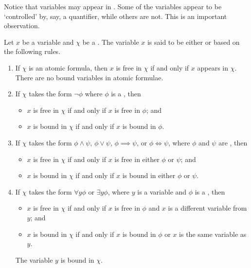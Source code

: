 Notice that variables may appear in \wffs. Some of the variables appear to be `controlled' by, say, a quantifier, while others are not. This is an important observation.

\begin{definition}
    Let $x$ be a variable and $\chi$ be a \wff. The variable $x$ is said to be either  or  based on the following rules.
    \begin{enumerate}[label=\textbf{V\arabic*.},leftmargin=1.35\parindent]
        \item If $\chi$ is an atomic formula, then $x$ is free in $\chi$ if and only if $x$ appears in $\chi$. There are no bound variables in atomic formulae.
        \item If $\chi$ takes the form $\lnot \phi$ where $\phi$ is a \wff, then
        \begin{itemize}
            \item $x$ is free in $\chi$ if and only if $x$ is free in $\phi$; and
            \item $x$ is bound in $\chi$ if and only if $x$ is bound in $\phi$.
        \end{itemize}
        \item If $\chi$ takes the form $\phi\land\psi$, $\phi\lor\psi$, $\phi\implies\psi$, or $\phi\iff\psi$, where $\phi$ and $\psi$ are \wffs, then
        \begin{itemize}
            \item $x$ is free in $\chi$ if and only if $x$ is free in either $\phi$ or $\psi$; and
            \item $x$ is bound in $\chi$ if and only if $x$ is bound in either $\phi$ or $\psi$.
        \end{itemize}
        \item If $\chi$ takes the form $\forall y \phi$ or $\exists y \phi$, where $y$ is a variable and $\phi$ is a \wff, then
        \begin{itemize}
            \item $x$ is free in $\chi$ if and only if $x$ is free in $\phi$ and $x$ is a different variable from $y$; and
            \item $x$ is bound in $\chi$ if and only if $x$ is bound in $\phi$ or $x$ is the same variable as $y$.
        \end{itemize}
        The variable $y$ is bound in $\chi$.
    \end{enumerate}
\end{definition}

